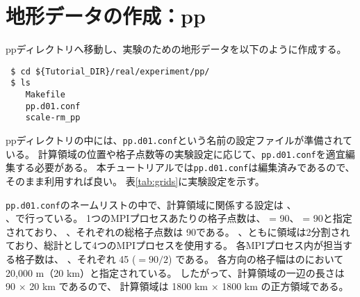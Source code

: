 \section{地形データの作成：pp} \label{sec:tutorial_real_pp}

ppディレクトリへ移動し、実験のための地形データを以下のように作成する。
\begin{verbatim}
 $ cd ${Tutorial_DIR}/real/experiment/pp/
 $ ls
    Makefile
    pp.d01.conf
    scale-rm_pp
\end{verbatim}
ppディレクトリの中には、\verb|pp.d01.conf|という名前の設定ファイルが準備されている。
計算領域の位置や格子点数等の実験設定に応じて、\verb|pp.d01.conf|を適宜編集する必要がある。
本チュートリアルでは\verb|pp.d01.conf|は編集済みであるので、そのまま利用すれば良い。
表\ref{tab:grids}に実験設定を示す。

\verb|pp.d01.conf|のネームリストの中で、計算領域に関係する設定は 、\\
、で行っている。
1つのMPIプロセスあたりの格子点数は、 = 90、 = 90と指定されており、
{\XDIR} 、{\YDIR}それぞれの総格子点数は 90である。
{\XDIR} 、{\YDIR}ともに領域は2分割されており、総計として4つのMPIプロセスを使用する。
各MPIプロセス内が担当する格子数は、{\XDIR} 、{\YDIR}それぞれ 45 ($=90 / 2$) である。
各方向の格子幅はのにおいて 20,000 m（20 km）と指定されている。
したがって、計算領域の一辺の長さは 90 $\times$ 20 km であるので、
計算領域は 1800 km $\times$ 1800 km の正方領域である。

